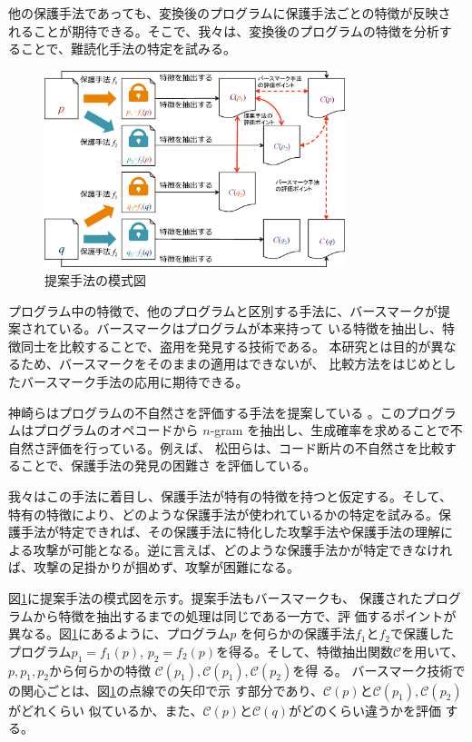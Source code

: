 \documentclass[12pt,twoside]{jbook}
\newcommand{\birth}[1]{\mathcal{C}(#1)}
\begin{document}
他の保護手法であっても、変換後のプログラムに保護手法ごとの特徴が反映さ
れることが期待できる。そこで、我々は、変換後のプログラムの特徴を分析す
ることで、難読化手法の特定を試みる。

\begin{figure}[b]
  \centering
  \includegraphics[width=0.78\textwidth]{images/key_idea}
  \caption{提案手法の模式図}\label{fig:keyidea}
\end{figure}

プログラム中の特徴で、他のプログラムと区別する手法に、バースマークが提
案されている\cite{tamada05ieice}。バースマークはプログラムが本来持って
いる特徴を抽出し、特徴同士を比較することで、盗用を発見する技術である。
本研究とは目的が異なるため、バースマークをそのままの適用はできないが、
比較方法をはじめとしたバースマーク手法の応用に期待できる。

神崎らはプログラムの不自然さを評価する手法を提案している
\cite{kanzaki14ipsj}。このプログラムはプログラムのオペコードから
$n$-gram を抽出し、生成確率を求めることで不自然さ評価を行っている。例えば、
松田らは、コード断片の不自然さを比較することで、保護手法の発見の困難さ
を評価している\cite{matsuda15ipsj}。


我々はこの手法に着目し、保護手法が特有の特徴を持つと仮定する。そして、
特有の特徴により、どのような保護手法が使われているかの特定を試みる。保
護手法が特定できれば、その保護手法に特化した攻撃手法や保護手法の理解に
よる攻撃が可能となる。逆に言えば、どのような保護手法かが特定できなけれ
ば、攻撃の足掛かりが掴めず、攻撃が困難になる。

図\ref{fig:keyidea}に提案手法の模式図を示す。提案手法もバースマークも、
保護されたプログラムから特徴を抽出するまでの処理は同じである一方で、評
価するポイントが異なる。図\ref{fig:keyidea}にあるように、プログラム$p$
を何らかの保護手法$f_1$と$f_2$で保護したプログラム$p_1=f_1(p)$,
$p_2=f_2(p)$を得る。そして、特徴抽出関数$\mathcal{C}$を用いて、$p,
p_1, p_2$から何らかの特徴 $\birth{p_1}, \birth{p_1}, \birth{p_2}$を得
る。
%
バースマーク技術での関心ごとは、図\ref{fig:keyidea}の点線での矢印で示
す部分であり、$\birth{p}$と$\birth{p_1}, \birth{p_2}$がどれくらい
似ているか、また、$\birth{p}$と$\birth{q}$がどのくらい違うかを評価
する。
\end{document}

